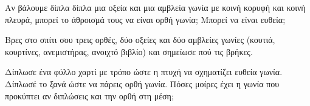 \ex Αν βάλουμε δίπλα δίπλα μια οξεία και μια αμβλεία γωνία με κοινή κορυφή και κοινή πλευρά, μπορεί το άθροισμά τους να είναι ορθή γωνία; Μπορεί να είναι ευθεία;


\ex Βρες στο σπίτι σου τρεις ορθές, δύο οξείες και δύο αμβλείες γωνίες (κουτιά, κουρτίνες, ανεμιστήρας, ανοιχτό βιβλίο) και σημείωσε πού τις βρήκες.

\ex Δίπλωσε ένα φύλλο χαρτί με τρόπο ώστε η πτυχή να σχηματίζει ευθεία γωνία. Δίπλωσέ το ξανά ώστε να πάρεις ορθή γωνία. Πόσες μοίρες έχει η γωνία που προκύπτει αν διπλώσεις και την ορθή στη μέση;
